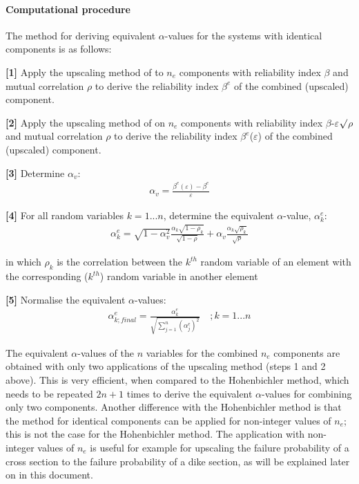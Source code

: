 {\paragraph*{Computational procedure}

The method for deriving equivalent $\alpha$-values for the systems with identical components is as follows:

\textbf{[1]} Apply the upscaling method of  to $n_{e}$ components with reliability index $\beta$ and mutual correlation $\rho$ to derive the reliability index $\beta^e$ of the combined (upscaled) component.

\textbf{[2]} Apply the upscaling method of  on $n_{e}$ components with reliability index   $\beta$-$\varepsilon$$\surd$$\rho$ and mutual correlation $\rho$ to derive the reliability index $\beta^e$($\varepsilon$) of the combined (upscaled) component.

\textbf{[3]} Determine $\alpha_v$: 
\begin{align}
\alpha _{v} =\frac{\beta ^{e} \left(\varepsilon \right)-\beta ^{e} }{\varepsilon } \label{0.159)} 
\end{align}

\textbf{[4]} For all random variables $k=1...n$, determine the equivalent $\alpha$-value, $\alpha_k^e$:
\begin{align}
\alpha _{k}^{e} =\sqrt{1-\alpha _{v}^{2} } \frac{\alpha _{k} \sqrt{1-\rho _{k} } }{\sqrt{1-\rho } } +\alpha _{v} \frac{\alpha _{k} \sqrt{\rho _{k} } }{\sqrt{\rho } } \label{0.163)} 
\end{align}

in which $\rho _{k}$ is the correlation between the $k^{th}$ random variable of an element with the corresponding ($k^{th}$) random variable in another element

\textbf{[5]} Normalise the equivalent $\alpha$-values:
\begin{align}
\alpha _{k;final}^{e} =\frac{\alpha _{k}^{e} }{\sqrt{\sum _{j=1}^{n}\left(\alpha _{j}^{e} \right)^{2}  } } \quad ;k=1...n\label{0.122)} 
\end{align}

The equivalent $\alpha$-values of the $n$ variables for the combined $n_{e}$ components are obtained with only two applications of the upscaling method (steps 1 and 2 above).
This is very efficient, when compared to the Hohenbichler method, which needs to be repeated $2n+1$ times to derive the equivalent $\alpha$-values for combining only two components.
Another difference with the Hohenbichler method is that the method for identical components can be applied for non-integer values of $n_{e}$; this is not the case for the Hohenbichler method.
The application with non-integer values of $n_{e}$ is useful for example for upscaling the failure probability of a cross section to the failure probability of a dike section, as will be explained later on in this document.

}
